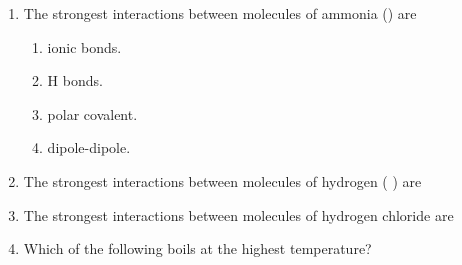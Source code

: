 \documentclass[main.tex]{subfiles}
\begin{document}
\begin{fullwidth}
\begin{multicols}{2}
\begin{enumerate}[resume]
		
\item The strongest interactions between molecules of ammonia () are
\begin{enumerate}[label=(\alph*)]\vspace{-0.5cm}
\item  ionic bonds.
\item  H bonds.
\item  polar covalent.
\item  dipole-dipole.
\end{enumerate}\vspace{-0.5cm}

		
\item The strongest interactions between molecules of hydrogen ( ) are
\begin{enumerate}[label=(\alph*)]\vspace{-0.5cm}
\end{enumerate}\vspace{-0.5cm}
		
\item The strongest interactions between molecules of hydrogen chloride are
\begin{enumerate}[label=(\alph*)]\vspace{-0.5cm}
\end{enumerate}\vspace{-0.5cm}

\item Which of the following boils at the highest temperature?
\begin{enumerate}[label=(\alph*)]\vspace{-0.5cm}
\end{enumerate}\vspace{-0.5cm}


\end{enumerate}
\end{multicols}
\end{fullwidth}
\end{document}
